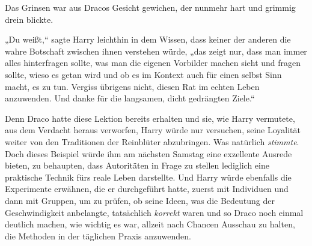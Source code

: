 Das Grinsen war aus Dracos Gesicht gewichen, der nunmehr hart und grimmig drein blickte.

„Du weißt,“ sagte Harry leichthin in dem Wissen, dass keiner der anderen die wahre Botschaft zwischen ihnen verstehen würde, „das zeigt nur, dass man immer alles hinterfragen sollte, was man die eigenen Vorbilder machen sieht und fragen sollte, wieso es getan wird und ob es im Kontext auch für einen selbst Sinn macht, es zu tun. Vergiss übrigens nicht, diesen Rat im echten Leben anzuwenden. Und danke für die langsamen, dicht gedrängten Ziele.“

Denn Draco hatte diese Lektion bereits erhalten und sie, wie Harry vermutete, aus dem Verdacht heraus verworfen, Harry würde nur versuchen, seine Loyalität weiter von den Traditionen der Reinblüter abzubringen. Was natürlich \emph{stimmte}. Doch dieses Beispiel würde ihm am nächsten Samstag eine exzellente Ausrede bieten, zu behaupten, dass Autoritäten in Frage zu stellen lediglich eine praktische Technik fürs reale Leben darstellte. Und Harry würde ebenfalls die Experimente erwähnen, die er durchgeführt hatte, zuerst mit Individuen und dann mit Gruppen, um zu prüfen, ob seine Ideen, was die Bedeutung der Geschwindigkeit anbelangte, tatsächlich \emph{korrekt} waren und so Draco noch einmal deutlich machen, wie wichtig es war, allzeit nach Chancen Ausschau zu halten, die Methoden in der täglichen Praxis anzuwenden.

